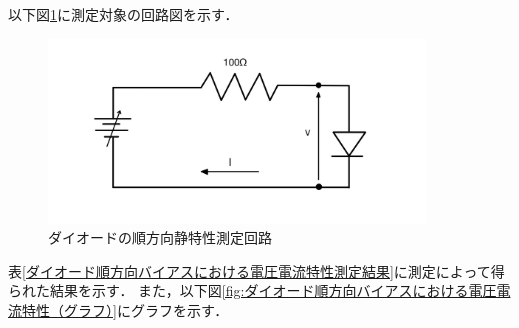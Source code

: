 \documentclass[titlepage]{jarticle}
\begin{document}
以下図\ref{fig:ダイオードの順方向静特性測定回路}に測定対象の回路図を示す．
\begin{figure}[H]
    \begin{center}
        \includegraphics[width=10cm]{image/dt.jpg}
        \caption{ダイオードの順方向静特性測定回路}
        \label{fig:ダイオードの順方向静特性測定回路}
    \end{center}
\end{figure}

表\ref{ダイオード順方向バイアスにおける電圧電流特性測定結果}に測定によって得られた結果を示す．
また，以下図\ref{fig:ダイオード順方向バイアスにおける電圧電流特性（グラフ）}にグラフを示す．
\end{document}
